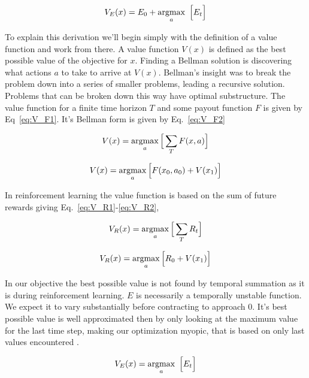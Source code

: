 \begin{equation}
	\label{eq:V_E} 
	V_E(x) = E_0 + \operatorname*{argmax}_a \ \Big [ E_t \Big ] \\
\end{equation}

To explain this derivation we'll begin simply with the definition of a value function and work from there. A value function $V(x)$ is defined as the best possible value of the objective for $x$. Finding a Bellman solution is discovering what actions $a$ to take to arrive at $V(x)$. Bellman's insight was to break the problem down into a series of smaller problems, leading a recursive solution. Problems that can be broken down this way have optimal substructure. The value function for a finite time horizon $T$ and some payout function $F$ is given by Eq~\ref{eq:V_F1}. It's Bellman form is given by Eq.~\ref{eq:V_F2}

\begin{equation}
	\label{eq:V_F1}
	V(x) = \operatorname*{argmax}_a \Big [ \sum_T F(x, a) \Big ]
\end{equation}

\begin{equation}
	\label{eq:V_F2}
	V(x) = \operatorname*{argmax}_a \Big [ F(x_0, a_0) + V(x_1) \Big ]
\end{equation}

In reinforcement learning the value function is based on the sum of future rewards giving Eq.~\ref{eq:V_R1}-\ref{eq:V_R2},

\begin{equation}
	\label{eq:V_R1}
	V_R(x) = \operatorname*{argmax}_a \Big [ \sum_T R_t \Big ]
\end{equation}

\begin{equation}
	\label{eq:V_R2}
	V_R(x) = \operatorname*{argmax}_a \Big [ R_0 + V(x_1) \Big ] \\
\end{equation}

In our objective the best possible value is not found by temporal summation as it is during reinforcement learning. $E$ is necessarily a temporally unstable function. We expect it to vary substantially before contracting to approach 0. It's best possible value is well approximated then by only looking at the maximum value for the last time step, making our optimization myopic, that is based on only last values encountered \citep{Hocker2019}.

\begin{equation}
	\label{eq:V_E1} 
	V_E(x) = \operatorname*{argmax}_a \ \Big [ E_t \Big ]
\end{equation}

